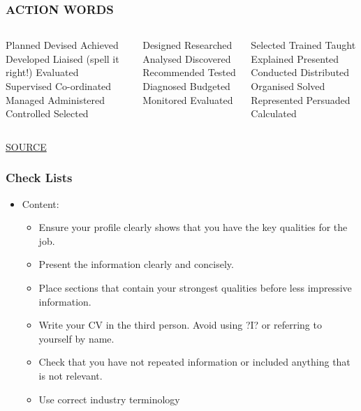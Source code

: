 \begin{frame}
\frametitle{ACTION WORDS}
\begin{columns}
	\begin{column}{0.3\textwidth}
Planned	Devised	Achieved
Developed	Liaised (spell it right!)	Evaluated
Supervised	Co-ordinated	Managed
Administered	Controlled	 Selected
	\end{column}
	\begin{column}{0.3\textwidth}  
Designed	Researched	Analysed
Discovered	Recommended	Tested
Diagnosed	Budgeted	Monitored
Evaluated	
	\end{column}
	\begin{column}{0.3\textwidth}   
Selected	Trained	Taught
Explained	Presented	Conducted
Distributed	Organised	Solved
Represented	Persuaded	Calculated	
	\end{column}
\end{columns}
\vspace{1cm}
\href{https://www.kent.ac.uk/careers/cv/actionverbs.htm}{SOURCE}

\end{frame}

\begin{frame}
	\frametitle{Check Lists}
	\begin{itemize}
		\item Content:
  		\begin{itemize}
			\item Ensure your profile clearly shows that you have the key qualities for the job.
    			\item Present the information clearly and concisely.
			\item Place sections that contain your strongest qualities before less impressive information.
			\item Write your CV in the third person. Avoid using ?I? or referring to yourself by name.
			\item Check that you have not repeated information or included anything that is not relevant.
			\item Use correct industry terminology
    		 \end{itemize}
	\end{itemize}
\end{frame}

